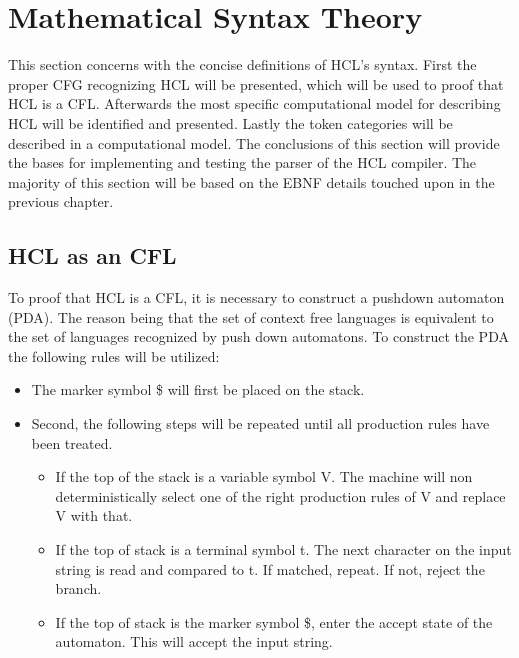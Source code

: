 \section{Mathematical Syntax Theory}
This section concerns with the concise definitions of HCL's syntax.
First the proper CFG recognizing HCL will be presented, which will be used to proof that HCL is a CFL. 
Afterwards the most specific computational model for describing HCL will be identified and presented. 
Lastly the token categories will be described in a computational model. 
The conclusions of this section will provide the bases for implementing and testing the parser of the HCL compiler. 
The majority of this section will be based on the EBNF details touched upon in the previous chapter.

\subsection{HCL as an CFL}

To proof that HCL is a CFL, it is necessary to construct a pushdown automaton (PDA).
The reason being that the set of context free languages is equivalent to the set of languages recognized by push down automatons.
To construct the PDA the following rules will be utilized:
\begin{center}
	\begin{itemize}
		\item The marker symbol \$ will first be placed on the stack.
		\item Second, the following steps will be repeated until all production rules have been treated.
		\begin{itemize}
			\item If the top of the stack is a variable symbol V. The machine will non deterministically select one of the right production rules of V and replace V with that.   
			\item If the top of stack is a terminal symbol t. 
			The next character on the input string is read and compared to t. 
			If matched, repeat. 
			If not, reject the branch.
			\item If the top of stack is the marker symbol \$, enter the accept state of the automaton. 
			This will accept the input string.
		\end{itemize}
	\end{itemize}
\end{center}

